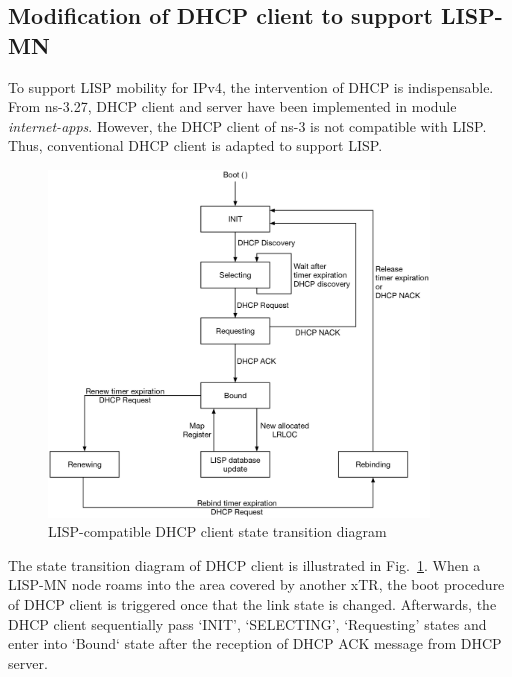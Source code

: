 \subsection{Modification of DHCP client to support LISP-MN}
\label{subsec:DHCP}
To support LISP mobility for IPv4, the intervention of DHCP is indispensable. From ns-3.27, DHCP client and server have been implemented in module \emph{internet-apps}. However, the DHCP client of ns-3 is not compatible with LISP. Thus, conventional DHCP client is adapted to support LISP.
\begin{figure}[!t]
	\centering
	\includegraphics[width=0.9\textwidth]{Pics/DHCP_transition_state.eps}
	\caption{LISP-compatible DHCP client state transition diagram}
	\label{fig:DHCP-state-transition}
\end{figure}
The state transition diagram of DHCP client is illustrated in Fig.~\ref{fig:DHCP-state-transition}. When a LISP-MN node roams into the area covered by another xTR, the boot procedure of DHCP client is triggered once that the link state is changed. Afterwards, the DHCP client sequentially pass `INIT', `SELECTING', `Requesting' states and enter into `Bound` state after the reception of DHCP ACK message from DHCP server.
